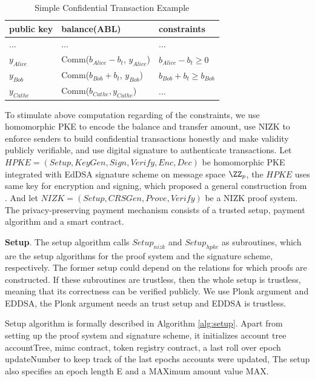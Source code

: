 \documentclass{article}
\begin{document}
\begin{table}
\centering
\begin{tabular}{l|l|l}
public key & balance(ABL) & constraints \\
\hline
... & ... & ...  \\
\hline
$y_{Alice}$  & Comm($b_{Alice} - b_t$, $y_{Alice}$) & $b_{Alice} - b_t \ge 0$ \\
\hline
$y_{Bob}$  & Comm($b_{Bob} + b_t$, $y_{Bob}$) & $b_{Bob} + b_t \ge b_{Bob} $  \\
\hline
$y_{Cathe}$  & Comm($b_{Cathe}, y_{Cathe}$) & ...   \\
\end{tabular}
\caption{\label{tab:transfer}Simple Confidential Transaction Example}
\end{table}

To stimulate above computation regarding of the constraints, we use homomorphic PKE to encode the balance and transfer amount, use NIZK to enforce senders to build confidential transactions honestly and make validity publicly verifiable, and use digital signature to authenticate transactions. Let $HPKE = (Setup, KeyGen, Sign, Verify, Enc, Dec)$ be homomorphic PKE integrated with EdDSA signature scheme on message space $\ZZ_p$, the $HPKE$ uses same key for encryption and signing, which proposed a general construction from \cite{paterson2011joint}. And let $NIZK = (Setup, CRSGen, Prove, Verify)$ be a NIZK proof system. The privacy-preserving payment mechanism consists of a trusted setup, payment algorithm and a smart contract.

\textbf{Setup}. The setup algorithm calls $Setup_{nizk}$ and $Setup_{hpke}$ as subroutines, which are the setup algorithms for the proof system and the signature scheme, respectively. The former setup could depend on the relations for which proofs are constructed. If these subroutines are trustless, then the whole setup is trustless, meaning that its correctness can be verified publicly. We use Plonk argument and EDDSA, the Plonk argument needs an trust setup and EDDSA is trustless.

Setup algorithm is formally described in Algorithm \ref{alg:setup}. Apart from setting up the proof system and signature scheme, it initializes account tree accountTree, mimc contract, token registry contract, a last roll over epoch updateNumber to keep track of the last epochs accounts were updated, The setup also specifies an epoch length E and a \mbox{MAX}imum amount value \mbox{MAX}.
\end{document}
